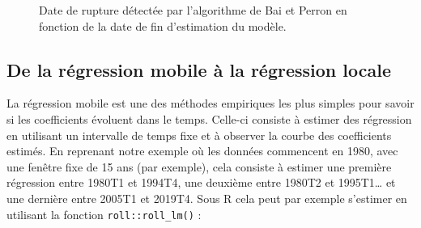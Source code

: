 \documentclass[
  a4paper,
  DIV=11,
  numbers=noendperiod,
  french]{scrartcl}
\newenvironment{Shaded}{\begin{snugshade}}{\end{snugshade}}
\newcommand{\AttributeTok}[1]{\textcolor[rgb]{0.40,0.45,0.13}{#1}}
\newcommand{\DecValTok}[1]{\textcolor[rgb]{0.68,0.00,0.00}{#1}}
\newcommand{\FunctionTok}[1]{\textcolor[rgb]{0.28,0.35,0.67}{#1}}
\newcommand{\NormalTok}[1]{\textcolor[rgb]{0.00,0.23,0.31}{#1}}
\newcommand{\OtherTok}[1]{\textcolor[rgb]{0.00,0.23,0.31}{#1}}
\newcommand{\SpecialCharTok}[1]{\textcolor[rgb]{0.37,0.37,0.37}{#1}}
\newcommand{\StringTok}[1]{\textcolor[rgb]{0.13,0.47,0.30}{#1}}
\newcommand\1{{\mathds 1}}
\theoremstyle{remark}
\begin{document}
\begin{figure}

\caption{\label{fig-temps-reel-bp}Date de rupture détectée par
l'algorithme de Bai et Perron en fonction de la date de fin d'estimation
du modèle.}


\end{figure}%

\subsection{De la régression mobile à la régression
locale}\label{sec-reg-locale}

La régression mobile est une des méthodes empiriques les plus simples
pour savoir si les coefficients évoluent dans le temps. Celle-ci
consiste à estimer des régression en utilisant un intervalle de temps
fixe et à observer la courbe des coefficients estimés. En reprenant
notre exemple où les données commencent en 1980, avec une fenêtre fixe
de 15 ans (par exemple), cela consiste à estimer une première régression
entre 1980T1 et 1994T4, une deuxième entre 1980T2 et 1995T1\ldots{} et
une dernière entre 2005T1 et 2019T4. Sous R cela peut par exemple
s'estimer en utilisant la fonction \texttt{roll::roll\_lm()}
\autocite{roll} :

\begin{Shaded}
\end{Shaded}
\end{document}
